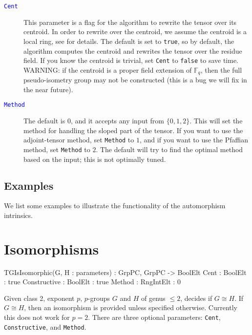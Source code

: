 \documentclass{documentation}
\begin{document}
\begin{description}
\item[\textcolor{blue}{\tt Cent}]
This parameter is a flag for the algorithm to rewrite the tensor over its centroid. 
In order to rewrite over the centroid, we assume the centroid is a local ring, see \cite{eMAGma} for details.
The default is set to {\tt true}, so by default, the algorithm computes the centroid and rewrites the tensor over the residue field.
If you know the centroid is trivial, set {\tt Cent} to {\tt false} to save time.
WARNING: if the centroid is a proper field extension of $\mathbb{F}_q$, then the full pseudo-isometry group may not be constructed (this is a bug we will fix in the near future).
\item[\textcolor{blue}{\tt Method}]
The default is $0$, and it accepts any input from $\{ 0,1,2\}$. 
This will set the method for handling the sloped part of the tensor.
If you want to use the adjoint-tensor method, set {\tt Method} to $1$, and if you want to use the Pfaffian method, set {\tt Method} to $2$. The default will try to find the optimal method based on the input; this is not optimally tuned.
\end{description}

\section{Examples}
We list some examples to illustrate the functionality of the automorphism intrinsics.

\chapter{Isomorphisms}

\begin{intrinsics}
TGIsIsomorphic(G, H : parameters) : GrpPC, GrpPC -> BoolElt
    Cent : BoolElt : true
    Constructive : BoolElt : true
    Method : RngIntElt : 0
\end{intrinsics}

Given class 2, exponent $p$, $p$-groups $G$ and $H$ of genus $\leq 2$, decides if $G\cong H$.
If $G\cong H$, then an isomorphism is provided unless specified otherwise.
Currently this does not work for $p=2$.  
There are three optional parameters: {\tt Cent}, {\tt Constructive}, and {\tt Method}.
\end{document}
